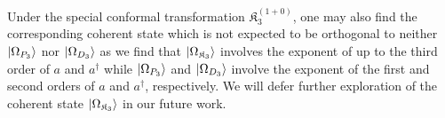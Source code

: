 \documentclass[%
 reprint,
superscriptaddress,
 amsmath,amssymb,
 aps,
]{revtex4-2}
\begin{document}
Under the special conformal transformation $\mathfrak{K}^{(1+0)}_{{3}}$, one may also find the corresponding coherent state which is not expected to be orthogonal to neither $\ket{\Omega_{P_{3}}}$ nor $\ket{\Omega_{D_{3}}}$ as we find that $\ket{\Omega_{\mathfrak{K}_{3}}}$ involves the exponent of up to the third order of $a$ and $a^\dagger$ while $\ket{\Omega_{P_{3}}}$ and $\ket{\Omega_{D_{3}}}$ involve the exponent of the first and second orders of $a$ and $a^\dagger$, respectively. 
We will defer further exploration of the coherent state $\ket{\Omega_{\mathfrak{K}_{3}}}$ in 
our future work.
\end{document}
